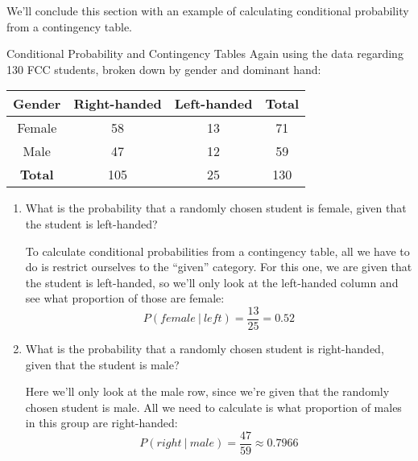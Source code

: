 We'll conclude this section with an example of calculating conditional probability from a contingency table.

\begin{example}[https://www.youtube.com/watch?v=0oCoc5B1lVU]{Conditional Probability and Contingency Tables}
Again using the data regarding 130 FCC students, broken down by gender and dominant hand:
\begin{center}
\begin{tabular}{|c|c|c|c|}
\hline
Gender & Right-handed & Left-handed & \textbf{Total} \\ \hline 
Female & 58 & 13 & 71\\ \hline
Male & 47 & 12 & 59  \\ \hline
\textbf{Total} & 105 & 25 & 130 \\ \hline 
\end{tabular}
\end{center}

\begin{enumerate}
\item What is the probability that a randomly chosen student is female, given that the student is left-handed?
\begin{center}
To calculate conditional probabilities from a contingency table, all we have to do is restrict ourselves to the ``given'' category.  For this one, we are given that the student is left-handed, so we'll only look at the left-handed column and see what proportion of those are female:
\[P(female \ | \ left) = \frac{13}{25} = 0.52\]
\end{center}

\item What is the probability that a randomly chosen student is right-handed, given that the student is male?
\begin{center}
Here we'll only look at the male row, since we're given that the randomly chosen student is male.  All we need to calculate is what proportion of males in this group are right-handed:
\[P(right \ | \ male) = \frac{47}{59} \approx 0.7966\]
\end{center}
\end{enumerate}
\end{example}

